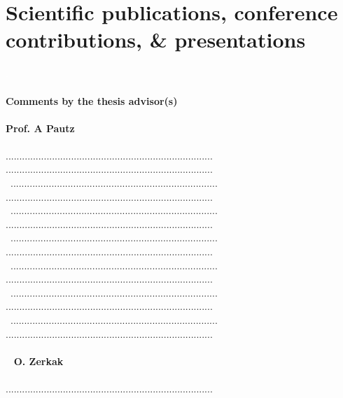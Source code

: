 \documentclass[11pt,titlepage]{article}
\begin{document}
\section{Scientific publications, conference contributions, \& presentations}

\nocite{Wicaksono2016}
\nocite{Wicaksono2016a}
\nocite{Wicaksono2016b}
\nocite{Wicaksono2016c}
\nocite{WicaksonoPPTa}
\nocite{WicaksonoPPTb}
\nocite{WicaksonoPPTc}

\printbibliography[heading=none]
\clearpage

\newpage
\textcolor{white}.\\\\
\noindent \textbf{Comments by the thesis advisor(s)}\\\\
\noindent\textbf{Prof. A Pautz}\\\\
............................................................................
............................................................................\\\
............................................................................
............................................................................\\\
............................................................................
............................................................................\\\
............................................................................
............................................................................\\\
............................................................................
............................................................................\\\
............................................................................
............................................................................\\\
............................................................................
............................................................................\\\\\
%
\noindent\textbf{O. Zerkak}\\\\
............................................................................
\end{document}
